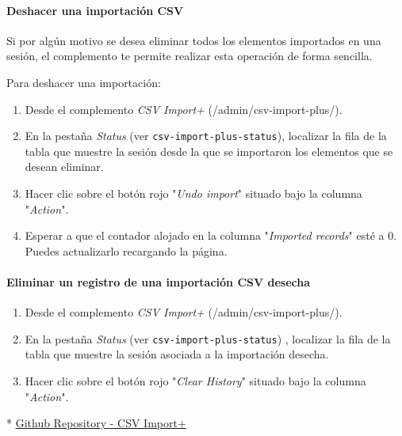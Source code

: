 \documentclass[
]{article}
\providecommand{\tightlist}{%
  \setlength{\itemsep}{0pt}\setlength{\parskip}{0pt}}
\begin{document}
\hypertarget{deshacer-una-importaciuxf3n-csv}{%
\paragraph{Deshacer una importación
CSV}\label{deshacer-una-importaciuxf3n-csv}}

Si por algún motivo se desea eliminar todos los elementos importados en
una sesión, el complemento te permite realizar esta operación de forma
sencilla.

Para deshacer una importación:

\begin{enumerate}
\def\labelenumi{\arabic{enumi}.}
\tightlist
\item
  Desde el complemento \emph{CSV Import+} ({/admin/csv-import-plus/}).
\item
  En la pestaña \emph{Status} (ver \texttt{csv-import-plus-status}),
  localizar la fila de la tabla que muestre la sesión desde la que se
  importaron los elementos que se desean eliminar.
\item
  Hacer clic sobre el botón rojo "\emph{Undo import}" situado bajo la
  columna "\emph{Action}".
\item
  Esperar a que el contador alojado en la columna "\emph{Imported
  records}" esté a 0. Puedes actualizarlo recargando la página.
\end{enumerate}

\hypertarget{eliminar-un-registro-de-una-importaciuxf3n-csv-desecha}{%
\paragraph{Eliminar un registro de una importación CSV
desecha}\label{eliminar-un-registro-de-una-importaciuxf3n-csv-desecha}}

\begin{enumerate}
\def\labelenumi{\arabic{enumi}.}
\tightlist
\item
  Desde el complemento \emph{CSV Import+} ({/admin/csv-import-plus/}).
\item
  En la pestaña \emph{Status} (ver \texttt{csv-import-plus-status}) ,
  localizar la fila de la tabla que muestre la sesión asociada a la
  importación desecha.
\item
  Hacer clic sobre el botón rojo "\emph{Clear History}" situado bajo la
  columna "\emph{Action}".
\end{enumerate}

* \href{https://github.com/biblibre/omeka-plugin-CsvImportPlus}{Github
Repository - CSV Import+}
\end{document}

